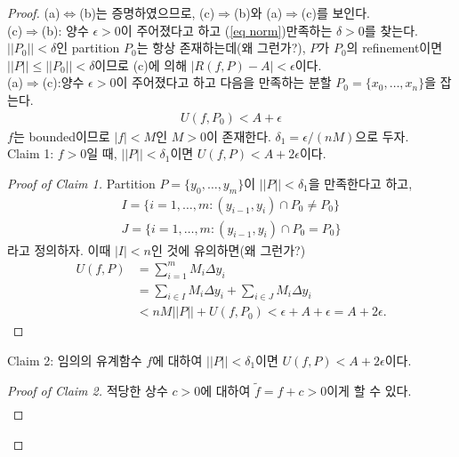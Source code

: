 \documentclass[12pt]{article}
\theoremstyle{definition}
\def\eps{\epsilon}
\newcommand{\abs}[1]{\left\vert#1\right\vert}
\newcommand{\norm}[1]{\left\vert\left\vert#1\right\vert\right\vert}
\begin{document}
\begin{proof}
	(a)$\Leftrightarrow$(b)는 증명하였으므로, (c)$\Rightarrow$(b)와 (a)$\Rightarrow$(c)를 보인다.\\
	(c)$\Rightarrow$(b): 양수 \(\eps > 0\)이 주어졌다고 하고 (\ref{eq norm})\을 만족하는 \(\delta > 0\)를 찾는다. \(\norm{P_0} < \delta\)인 partition \(P_0\)는 항상 존재하는데(왜 그런가?), \(P\)가 \(P_0\)의 refinement이면 \(\norm{P} \le \norm{P_0} < \delta\)이므로 (c)에 의해 \(\abs{R(f, P) - A} < \eps\)이다.\\
	(a)$\Rightarrow$(c):양수 \(\eps > 0\)이 주어졌다고 하고 다음을 만족하는 분할 \(P_0 = \{x_0, \ldots, x_n\}\)을 잡는다.
	\begin{gather*}
		U(f, P_0) < A + \eps
	\end{gather*}
	\(f\)는 bounded이므로 \(\abs{f} < M\)인 \(M > 0\)이 존재한다. \(\delta_1 = \eps / (nM)\)으로 두자.\\
	Claim 1: \(f > 0\)일 때, \(\norm{P} < \delta_1\)이면 \(U(f, P) < A + 2\eps\)이다.
	\begin{list}{}{\leftmargin=\parindent\rightmargin=0pt}
		\item
		\begin{proof}[Proof of Claim 1]
			Partition \(P = \{y_0, \ldots, y_m\}\)이 \(\norm{P} < \delta_1\)을 만족한다고 하고,
			\begin{gather*}
				I = \{i = 1, \ldots, m : (y_{i-1}, y_i) \cap P_0 \neq P_0\}\\
				J = \{i = 1, \ldots, m : (y_{i-1}, y_i) \cap P_0 = P_0\}
			\end{gather*}
			라고 정의하자. 이때 \(\abs{I} < n\)인 것에 유의하면(왜 그런가?)
			\begin{align*}
				U(f, P) &= \sum_{i=1}^m M_i \Delta y_i\\
				&= \sum_{i \in I} M_i \Delta y_i + \sum_{i \in J} M_i \Delta y_i\\
				&< nM \norm{P} + U(f, P_0) < \eps + A + \eps = A + 2\eps.
			\end{align*}
		\end{proof}
	\end{list}
	Claim 2: 임의의 유계함수 \(f\)에 대하여 \(\norm{P} < \delta_1\)이면 \(U(f, P) < A + 2\eps\)이다.
	\begin{list}{}{\leftmargin=\parindent\rightmargin=0pt}
		\item
		\begin{proof}[Proof of Claim 2]
			적당한 상수 \(c > 0\)에 대하여 \(\tilde{f} = f + c > 0\)이게 할 수 있다.
			\begin{gather*}

\end{gather*}
\end{proof}
\end{list}
\end{proof}
\end{document}
